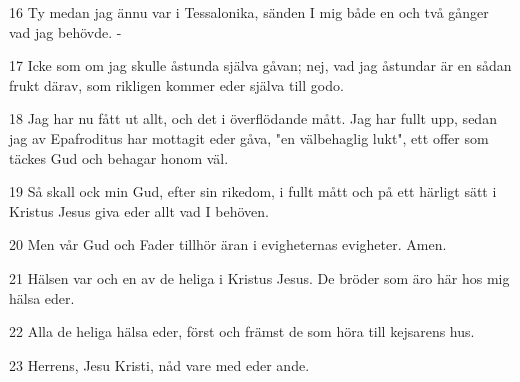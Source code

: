\par 16 Ty medan jag ännu var i Tessalonika, sänden I mig både en och två gånger vad jag behövde. -
\par 17 Icke som om jag skulle åstunda själva gåvan; nej, vad jag åstundar är en sådan frukt därav, som rikligen kommer eder själva till godo.
\par 18 Jag har nu fått ut allt, och det i överflödande mått. Jag har fullt upp, sedan jag av Epafroditus har mottagit eder gåva, "en välbehaglig lukt", ett offer som täckes Gud och behagar honom väl.
\par 19 Så skall ock min Gud, efter sin rikedom, i fullt mått och på ett härligt sätt i Kristus Jesus giva eder allt vad I behöven.
\par 20 Men vår Gud och Fader tillhör äran i evigheternas evigheter. Amen.
\par 21 Hälsen var och en av de heliga i Kristus Jesus. De bröder som äro här hos mig hälsa eder.
\par 22 Alla de heliga hälsa eder, först och främst de som höra till kejsarens hus.
\par 23 Herrens, Jesu Kristi, nåd vare med eder ande.


